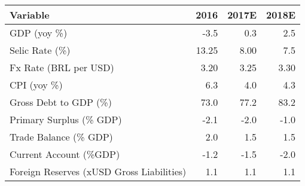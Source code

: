 \documentclass[11pt]{article}
\author{user}
\date{\today}
\title{}
\begin{document}
\begin{center}
\begin{tabular}{lrrr}
\textbf{Variable} & \textbf{2016} & \textbf{2017E} & \textbf{2018E}\\
\hline
\hline
GDP (yoy \%) & -3.5 & 0.3 & 2.5\\
Selic Rate (\%) & 13.25 & 8.00 & 7.5\\
Fx Rate (BRL per USD) & 3.20 & 3.25 & 3.30\\
CPI (yoy \%) & 6.3 & 4.0 & 4.3\\
Gross Debt to GDP (\%) & 73.0 & 77.2 & 83.2\\
Primary Surplus (\% GDP) & -2.1 & -2.0 & -1.0\\
Trade Balance (\% GDP) & 2.0 & 1.5 & 1.5\\
Current Account (\%GDP) & -1.2 & -1.5 & -2.0\\
Foreign Reserves (xUSD Gross Liabilities) & 1.1 & 1.1 & 1.1\\
\hline
\end{tabular}
\end{center}
\end{document}
